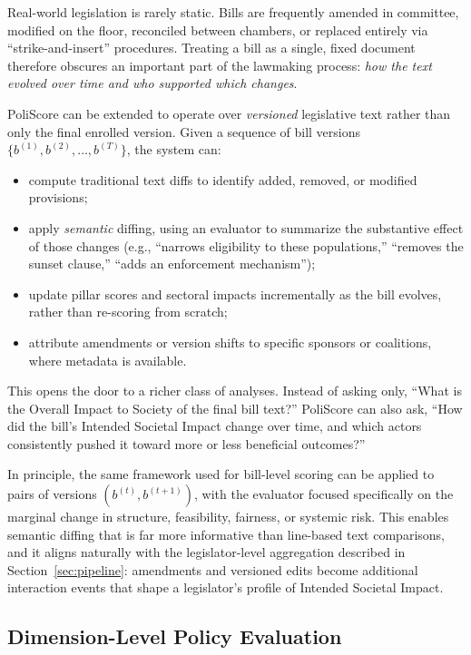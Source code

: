 \documentclass[12pt]{article}
\begin{document}
Real-world legislation is rarely static. Bills are frequently amended in committee, modified on the floor, reconciled
between chambers, or replaced entirely via ``strike-and-insert'' procedures. Treating a bill as a single, fixed document
therefore obscures an important part of the lawmaking process: \emph{how the text evolved over time and who supported
which changes}.

PoliScore can be extended to operate over \emph{versioned} legislative text rather than only the final enrolled version.
Given a sequence of bill versions \(\{b^{(1)}, b^{(2)}, \dots, b^{(T)}\}\), the system can:

\begin{itemize}
    \item compute traditional text diffs to identify added, removed, or modified provisions;
    \item apply \emph{semantic} diffing, using an evaluator to summarize the substantive effect of those changes (e.g.,
    ``narrows eligibility to these populations,'' ``removes the sunset clause,'' ``adds an enforcement mechanism'');
    \item update pillar scores and sectoral impacts incrementally as the bill evolves, rather than re-scoring from
    scratch;
    \item attribute amendments or version shifts to specific sponsors or coalitions, where metadata is available.
\end{itemize}

This opens the door to a richer class of analyses. Instead of asking only, ``What is the Overall Impact to Society of the
final bill text?'' PoliScore can also ask, ``How did the bill's Intended Societal Impact change over time, and which
actors consistently pushed it toward more or less beneficial outcomes?''

In principle, the same framework used for bill-level scoring can be applied to pairs of versions \((b^{(t)}, b^{(t+1)})\),
with the evaluator focused specifically on the marginal change in structure, feasibility, fairness, or systemic risk.
This enables semantic diffing that is far more informative than line-based text comparisons, and it aligns naturally with
the legislator-level aggregation described in Section~\ref{sec:pipeline}: amendments and versioned edits become additional
interaction events that shape a legislator's profile of Intended Societal Impact.

\subsection{Dimension-Level Policy Evaluation}
\end{document}
